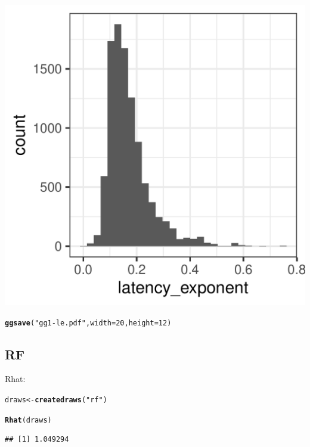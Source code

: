 \documentclass{article}\usepackage[]{graphicx}\usepackage[]{color}
\makeatletter
\def\maxwidth{ %
  \ifdim\Gin@nat@width>\linewidth
    \linewidth
  \else
    \Gin@nat@width
  \fi
}
\newcommand{\hlnum}[1]{\textcolor[rgb]{0.686,0.059,0.569}{#1}}%
\newcommand{\hlstr}[1]{\textcolor[rgb]{0.192,0.494,0.8}{#1}}%
\newcommand{\hlstd}[1]{\textcolor[rgb]{0.345,0.345,0.345}{#1}}%
\newcommand{\hlkwb}[1]{\textcolor[rgb]{0.69,0.353,0.396}{#1}}%
\newcommand{\hlkwc}[1]{\textcolor[rgb]{0.333,0.667,0.333}{#1}}%
\newcommand{\hlkwd}[1]{\textcolor[rgb]{0.737,0.353,0.396}{\textbf{#1}}}%
\newenvironment{kframe}{%
 \def\at@end@of@kframe{}%
 \ifinner\ifhmode%
  \def\at@end@of@kframe{\end{minipage}}%
  \begin{minipage}{\columnwidth}%
 \fi\fi%
 \def\FrameCommand##1{\hskip\@totalleftmargin \hskip-\fboxsep
 \colorbox{shadecolor}{##1}\hskip-\fboxsep
     \hskip-\linewidth \hskip-\@totalleftmargin \hskip\columnwidth}%
 \MakeFramed {\advance\hsize-\width
   \@totalleftmargin\z@ \linewidth\hsize
   \@setminipage}}%
 {\par\unskip\endMakeFramed%
 \at@end@of@kframe}
\newenvironment{knitrout}{}{} %
\makeatother
\begin{document}
\begin{knitrout}
\begin{kframe}
{\ttfamily\noindent\itshape\color{messagecolor}{\#\# `stat\_bin()` using `bins = 30`. Pick better value with `binwidth`.}}\end{kframe}
\includegraphics[width=\maxwidth]{figures/figure7regionsunnamed-chunk-15-1} 
\begin{kframe}\begin{alltt}
\hlkwd{ggsave}\hlstd{(}\hlstr{"gg1-le.pdf"}\hlstd{,} \hlkwc{width} \hlstd{=} \hlnum{20}\hlstd{,} \hlkwc{height} \hlstd{=} \hlnum{12}\hlstd{)}
\end{alltt}


{\ttfamily\noindent\itshape\color{messagecolor}{\#\# `stat\_bin()` using `bins = 30`. Pick better value with `binwidth`.}}\end{kframe}
\end{knitrout}

\subsection{RF}

Rhat:
\begin{knitrout}
\color{fgcolor}\begin{kframe}
\begin{alltt}
\hlstd{draws} \hlkwb{<-} \hlkwd{createdraws}\hlstd{(}\hlstr{"rf"}\hlstd{)}

\hlkwd{Rhat}\hlstd{(draws)}
\end{alltt}
\begin{verbatim}
## [1] 1.049294
\end{verbatim}
\end{kframe}
\end{knitrout}
\end{document}
